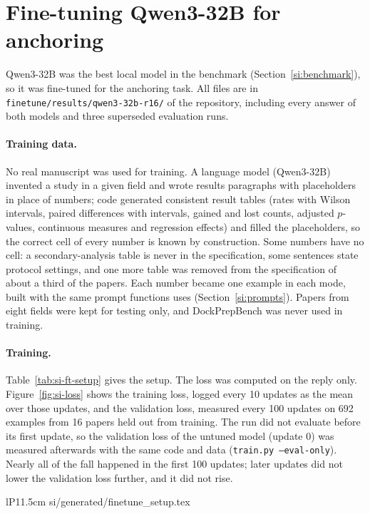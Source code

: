 \documentclass[11pt]{article}
\begin{document}
\section{Fine-tuning Qwen3-32B for anchoring}
\label{si:finetune}

Qwen3-32B was the best local model in the benchmark (Section~\ref{si:benchmark}), so it was
fine-tuned for the anchoring task. All files are in \texttt{finetune/results/qwen3-32b-r16/} of
the repository, including every answer of both models and three superseded evaluation runs.

\paragraph{Training data.} No real manuscript was used for training. A language model (Qwen3-32B)
invented a study in a given field and wrote results paragraphs with placeholders in place of
numbers; code generated consistent result tables (rates with Wilson intervals, paired differences
with intervals, gained and lost counts, adjusted $p$-values, continuous measures and regression
effects) and filled the placeholders, so the correct cell of every number is known by
construction. Some numbers have no cell: a secondary-analysis table is never in the
specification, some sentences state protocol settings, and one more table was removed from the
specification of about a third of the papers. Each number became one example in each mode, built
with the same prompt functions \pv{} uses (Section~\ref{si:prompts}). Papers from eight fields
were kept for testing only, and DockPrepBench was never used in training.

\paragraph{Training.} Table~\ref{tab:si-ft-setup} gives the setup. The loss was computed on the
reply only. Figure~\ref{fig:si-loss} shows the training loss, logged every 10 updates as the mean
over those updates, and the validation loss, measured every 100 updates on 692 examples from 16
papers held out from training. The run did not evaluate before its first update, so the
validation loss of the untuned model (update 0) was measured afterwards with the same code and
data (\texttt{train.py --eval-only}). Nearly all of the fall
happened in the first 100 updates; later updates did not lower the validation loss further, and
it did not rise.

\begin{table}[h]
\centering
\small
\caption{Fine-tuning setup (run \texttt{qwen3-32b-r16}), from the run's \texttt{config.json},
dataset statistics and trainer output.}
\label{tab:si-ft-setup}
\begin{tabular}{lP{11.5cm}}
\toprule
\rows si/generated/finetune_setup.tex
\bottomrule
\end{tabular}
\end{table}
\end{document}
